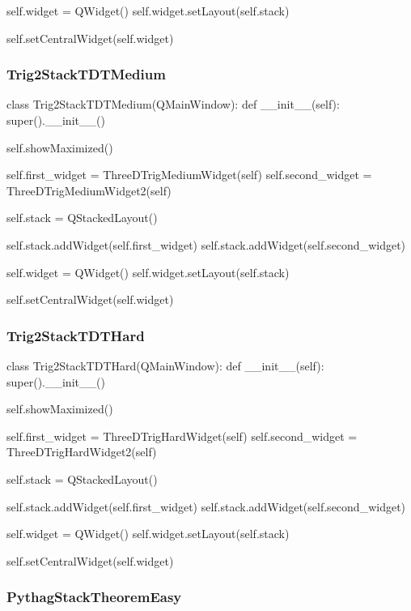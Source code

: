 \begin{landscape}
\begin{python}
        self.widget = QWidget()
        self.widget.setLayout(self.stack)

        self.setCentralWidget(self.widget)
\end{python}

\subsubsection{Trig2StackTDTMedium}

\begin{python}
class Trig2StackTDTMedium(QMainWindow):
    def __init__(self):
        super().__init__()

        self.showMaximized()

        self.first_widget = ThreeDTrigMediumWidget(self)
        self.second_widget = ThreeDTrigMediumWidget2(self)

        self.stack = QStackedLayout()

        self.stack.addWidget(self.first_widget)
        self.stack.addWidget(self.second_widget)

        self.widget = QWidget()
        self.widget.setLayout(self.stack)

        self.setCentralWidget(self.widget)
\end{python}

\subsubsection{Trig2StackTDTHard}

\begin{python}
class Trig2StackTDTHard(QMainWindow):
    def __init__(self):
        super().__init__()

        self.showMaximized()

        self.first_widget = ThreeDTrigHardWidget(self)
        self.second_widget = ThreeDTrigHardWidget2(self)

        self.stack = QStackedLayout()

        self.stack.addWidget(self.first_widget)
        self.stack.addWidget(self.second_widget)

        self.widget = QWidget()
        self.widget.setLayout(self.stack)

        self.setCentralWidget(self.widget)
\end{python}

\subsubsection{PythagStackTheoremEasy}


\end{landscape}
